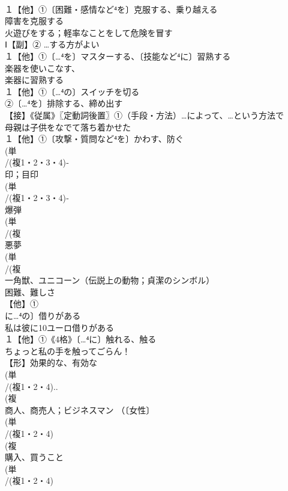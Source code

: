 \documentclass[8pt]{extreport}
\begin{document}
\begin{CJK}{UTF8}{min}
\\	１【他】①〔困難・感情など⁴を〕克服する、乗り越える 
\\	障害を克服する 
\\	火遊びをする；軽率なことをして危険を冒す
\\	Ⅰ【副】② …する方がよい
\\	１【他】①〔…⁴を〕マスターする、〔技能など⁴に〕習熟する 
\\	楽器を使いこなす、
\\	楽器に習熟する
\\	１【他】①〔…⁴の〕スイッチを切る 
\\	②〔…⁴を〕排除する、締め出す
\\	【接】《従属》〖定動詞後置〗①（手段・方法）…によって、…という方法で 
\\	母親は子供をなでて落ち着かせた
\\	１【他】①〔攻撃・質問など⁴を〕かわす、防ぐ 
\\	(単
\\	/(複1・2・3・4)‐ 
\\	印；目印
\\	(単
\\	/(複1・2・3・4)‐
\\	爆弾 
\\	(単
\\	/(複
\\	悪夢 
\\	(単
\\	/(複
\\	一角獣、ユニコーン（伝説上の動物；貞潔のシンボル） 
\\	困難、難しさ 
\\	【他】①
\\	に…⁴の〕借りがある 
\\	私は彼に10ユーロ借りがある
\\	１【他】①《4格》〔…⁴に〕触れる、触る 
\\	ちょっと私の手を触ってごらん！ 
\\	【形】効果的な、有効な 
\\	(単
\\	/(複1・2・4)..
\\	(複
\\	商人、商売人；ビジネスマン （〔女性〕
\\	(単
\\	/(複1・2・4)
\\	(複
\\	購入、買うこと 
\\	(単
\\	/(複1・2・4)

\end{CJK}
\end{document}
